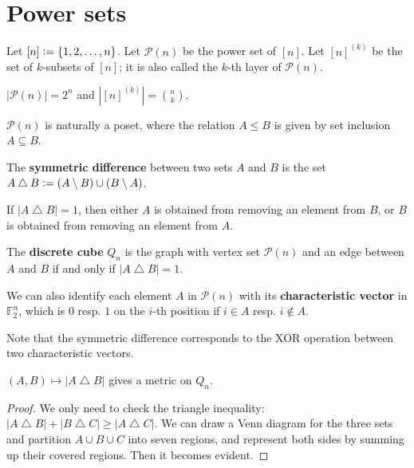 \section{Power sets}


Let $[n] \vcentcolon= \left\{ 1,2, \ldots ,n \right\} $.
Let $\mathcal{P}(n)$ be the power set of $[n]$.
Let $[n]^{(k)}$ be the set of $k$-subsets of $[n]$; it is also called the $k$-th layer of $\mathcal{P}(n)$.

\begin{proposition}
  $| \mathcal{P}(n) | = 2^n$ and $| [n] ^{(k)} | = \binom{n}{k}$.  
\end{proposition}


$\mathcal{P}(n)$ is naturally a poset, where the relation $A \le B$  is given by set inclusion $A \subseteq B$. 

\begin{definition}
  The \textbf{symmetric difference} between two sets $A$ and $B$ is the set $A \bigtriangleup B \vcentcolon= (A \setminus B) \cup (B \setminus A)$. 
\end{definition}


If $| A \bigtriangleup B | = 1$, then either $A$ is obtained from removing an element from $B$, or $B$ is obtained from removing an element from $A$. 


\begin{definition}
  The \textbf{discrete cube} $Q_n$ is the graph with vertex set $\mathcal{P}(n)$ and an edge between $A$ and $B$ if and only if $| A \bigtriangleup B | = 1$.    
\end{definition}


We can also identify each element $A$ in $\mathcal{P}(n)$ with its \textbf{characteristic vector} in $\mathbb{F}^n_2$, which is $0$ resp. $1$ on the $i$-th position  if $i \in A$ resp. $i \not \in A$. 

Note that the symmetric difference corresponds to the XOR operation between two characteristic vectors.



\begin{proposition}
  $(A, B) \mapsto | A \bigtriangleup B |$ gives a metric on $Q_n$.   
\end{proposition}

\begin{proof}
  We only need to check the triangle inequality: $| A \bigtriangleup B| + |B \bigtriangleup C| \ge | A \bigtriangleup C |$. We can draw a Venn diagram for the three sets and partition $A \cup B \cup C$ into seven regions, and represent both sides by summing up their covered regions.  Then it becomes evident.
\end{proof}

